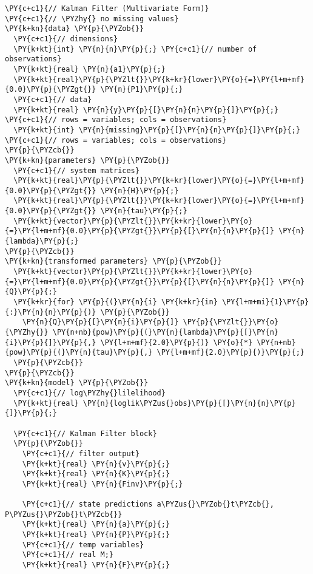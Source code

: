 \begin{Verbatim}[commandchars=\\\{\}]
\PY{c+c1}{// Kalman Filter (Multivariate Form)}
\PY{c+c1}{// \PYZhy{} no missing values}
\PY{k+kn}{data} \PY{p}{\PYZob{}}
  \PY{c+c1}{// dimensions}
  \PY{k+kt}{int} \PY{n}{n}\PY{p}{;} \PY{c+c1}{// number of observations}
  \PY{k+kt}{real} \PY{n}{a1}\PY{p}{;}
  \PY{k+kt}{real}\PY{p}{\PYZlt{}}\PY{k+kr}{lower}\PY{o}{=}\PY{l+m+mf}{0.0}\PY{p}{\PYZgt{}} \PY{n}{P1}\PY{p}{;}
  \PY{c+c1}{// data}
  \PY{k+kt}{real} \PY{n}{y}\PY{p}{[}\PY{n}{n}\PY{p}{]}\PY{p}{;} \PY{c+c1}{// rows = variables; cols = observations}
  \PY{k+kt}{int} \PY{n}{missing}\PY{p}{[}\PY{n}{n}\PY{p}{]}\PY{p}{;} \PY{c+c1}{// rows = variables; cols = observations}
\PY{p}{\PYZcb{}}
\PY{k+kn}{parameters} \PY{p}{\PYZob{}}
  \PY{c+c1}{// system matrices}
  \PY{k+kt}{real}\PY{p}{\PYZlt{}}\PY{k+kr}{lower}\PY{o}{=}\PY{l+m+mf}{0.0}\PY{p}{\PYZgt{}} \PY{n}{H}\PY{p}{;}
  \PY{k+kt}{real}\PY{p}{\PYZlt{}}\PY{k+kr}{lower}\PY{o}{=}\PY{l+m+mf}{0.0}\PY{p}{\PYZgt{}} \PY{n}{tau}\PY{p}{;}
  \PY{k+kt}{vector}\PY{p}{\PYZlt{}}\PY{k+kr}{lower}\PY{o}{=}\PY{l+m+mf}{0.0}\PY{p}{\PYZgt{}}\PY{p}{[}\PY{n}{n}\PY{p}{]} \PY{n}{lambda}\PY{p}{;}
\PY{p}{\PYZcb{}}
\PY{k+kn}{transformed parameters} \PY{p}{\PYZob{}}
  \PY{k+kt}{vector}\PY{p}{\PYZlt{}}\PY{k+kr}{lower}\PY{o}{=}\PY{l+m+mf}{0.0}\PY{p}{\PYZgt{}}\PY{p}{[}\PY{n}{n}\PY{p}{]} \PY{n}{Q}\PY{p}{;}
  \PY{k+kr}{for} \PY{p}{(}\PY{n}{i} \PY{k+kr}{in} \PY{l+m+mi}{1}\PY{p}{:}\PY{n}{n}\PY{p}{)} \PY{p}{\PYZob{}}
    \PY{n}{Q}\PY{p}{[}\PY{n}{i}\PY{p}{]} \PY{p}{\PYZlt{}}\PY{o}{\PYZhy{}} \PY{n+nb}{pow}\PY{p}{(}\PY{n}{lambda}\PY{p}{[}\PY{n}{i}\PY{p}{]}\PY{p}{,} \PY{l+m+mf}{2.0}\PY{p}{)} \PY{o}{*} \PY{n+nb}{pow}\PY{p}{(}\PY{n}{tau}\PY{p}{,} \PY{l+m+mf}{2.0}\PY{p}{)}\PY{p}{;}
  \PY{p}{\PYZcb{}}
\PY{p}{\PYZcb{}}
\PY{k+kn}{model} \PY{p}{\PYZob{}}
  \PY{c+c1}{// log\PYZhy{}lilelihood}
  \PY{k+kt}{real} \PY{n}{loglik\PYZus{}obs}\PY{p}{[}\PY{n}{n}\PY{p}{]}\PY{p}{;}

  \PY{c+c1}{// Kalman Filter block}
  \PY{p}{\PYZob{}}
    \PY{c+c1}{// filter output}
    \PY{k+kt}{real} \PY{n}{v}\PY{p}{;}
    \PY{k+kt}{real} \PY{n}{K}\PY{p}{;}
    \PY{k+kt}{real} \PY{n}{Finv}\PY{p}{;}
    
    \PY{c+c1}{// state predictions a\PYZus{}\PYZob{}t\PYZcb{}, P\PYZus{}\PYZob{}t\PYZcb{}}
    \PY{k+kt}{real} \PY{n}{a}\PY{p}{;}
    \PY{k+kt}{real} \PY{n}{P}\PY{p}{;}
    \PY{c+c1}{// temp variables}
    \PY{c+c1}{// real M;}
    \PY{k+kt}{real} \PY{n}{F}\PY{p}{;}
    

\end{Verbatim}
